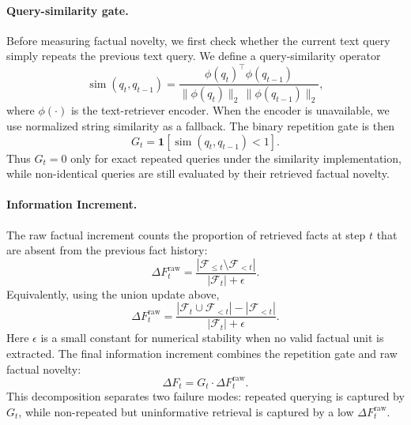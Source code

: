 \documentclass{article}
\newcommand{\df}{\Delta F}
\newcommand{\query}{q}
\newcommand{\facts}{\mathcal{F}}
\begin{document}
\paragraph{Query-similarity gate.}
Before measuring factual novelty, we first check whether the current text query simply repeats the previous text query.
We define a query-similarity operator
\begin{equation}
    \operatorname{sim}(\query_t,\query_{t-1})
    =
    \frac{
    \phi(\query_t)^\top \phi(\query_{t-1})
    }{
    \|\phi(\query_t)\|_2 \, \|\phi(\query_{t-1})\|_2
    },
\end{equation}
where $\phi(\cdot)$ is the text-retriever encoder.
When the encoder is unavailable, we use normalized string similarity as a fallback.
The binary repetition gate is then
\begin{equation}
    G_t = \mathbf{1}\!\left[\operatorname{sim}(\query_t,\query_{t-1}) < 1\right].
\end{equation}
Thus $G_t=0$ only for exact repeated queries under the similarity implementation, while non-identical queries are still evaluated by their retrieved factual novelty.

\paragraph{Information Increment.}
The raw factual increment counts the proportion of retrieved facts at step $t$ that are absent from the previous fact history:
\begin{equation}
    \Delta F_t^{\mathrm{raw}}
    =
    \frac{|\facts_{\leq t} \setminus \facts_{<t}|}{|\facts_t|+\epsilon}.
\end{equation}
Equivalently, using the union update above,
\begin{equation}
    \Delta F_t^{\mathrm{raw}}
    =
    \frac{|\facts_t \cup \facts_{<t}| - |\facts_{<t}|}{|\facts_t|+\epsilon}.
\end{equation}
Here $\epsilon$ is a small constant for numerical stability when no valid factual unit is extracted.
The final information increment combines the repetition gate and raw factual novelty:
\begin{equation}
    \df_t = G_t \cdot \Delta F_t^{\mathrm{raw}}.
\end{equation}
This decomposition separates two failure modes: repeated querying is captured by $G_t$, while non-repeated but uninformative retrieval is captured by a low $\Delta F_t^{\mathrm{raw}}$.
\end{document}
